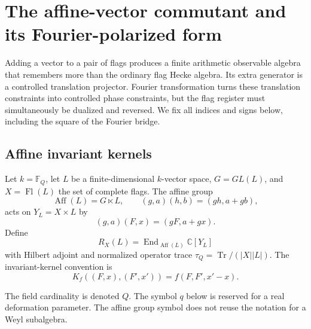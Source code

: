 \clearpage
\section{The affine-vector commutant and its Fourier-polarized form}
\label{sec:f1-limit-mirabolic}

Adding a vector to a pair of flags produces a finite arithmetic observable
algebra that remembers more than the ordinary flag Hecke algebra.  Its extra
generator is a controlled translation projector.  Fourier transformation
turns these translation constraints into controlled phase constraints, but
the flag register must simultaneously be dualized and reversed.  We fix all
indices and signs below, including the square of the Fourier bridge.

\subsection{Affine invariant kernels}

\begin{definition}
Let $k=\mathbb F_Q$, let $L$ be a finite-dimensional $k$-vector space,
$G=GL(L)$, and $X=\operatorname{Fl}(L)$ the set of complete flags.  The
affine group
\[
 \operatorname{Aff}(L)=G\ltimes L,
 \qquad (g,a)(h,b)=(gh,a+gb),
\]
acts on $Y_L=X\times L$ by
\[
 (g,a)(F,x)=(gF,a+gx).
\]
Define
\[
 R_X(L)=\operatorname{End}_{\operatorname{Aff}(L)}\mathbb C[Y_L]
\]
with Hilbert adjoint and normalized operator trace
$\tau_Q=\operatorname{Tr}/(|X||L|)$.  The invariant-kernel convention is
\[
 K_f((F,x),(F',x'))=f(F,F',x'-x).
\]
\end{definition}
\begin{scope}
The field cardinality is denoted $Q$.  The symbol $q$ below is reserved for a
real deformation parameter.  The affine group symbol does not reuse the
notation for a Weyl subalgebra.
\end{scope}

